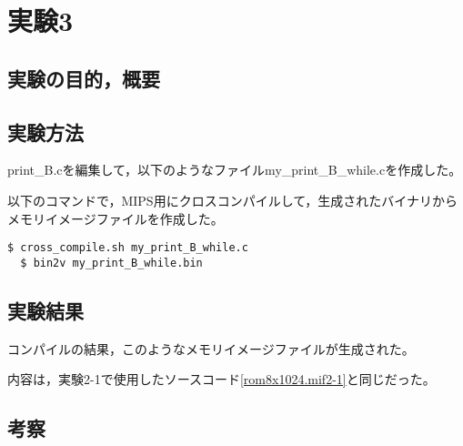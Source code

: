 \section{実験3}
\subsection{実験の目的，概要}

\subsection{実験方法}
print\_B.cを編集して，以下のようなファイルmy\_print\_B\_while.cを作成した。


以下のコマンドで，MIPS用にクロスコンパイルして，生成されたバイナリからメモリイメージファイルを作成した。

\begin{lstlisting}[caption={クロスコンパイル},label={クロスコンパイル}]
  $ cross_compile.sh my_print_B_while.c
  $ bin2v my_print_B_while.bin
\end{lstlisting}

\subsection{実験結果}
コンパイルの結果，このようなメモリイメージファイルが生成された。


内容は，実験2-1で使用したソースコード\ref{rom8x1024.mif2-1}と同じだった。

\subsection{考察}
